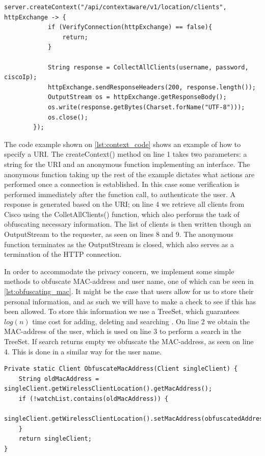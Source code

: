 \begin{lstlisting}[caption={Adding a URI},label={lst:context_code},language=inc_Java]
server.createContext("/api/contextaware/v1/location/clients", httpExchange -> {
            if (VerifyConnection(httpExchange) == false){
                return;
            }

            String response = CollectAllClients(username, password, ciscoIp);
            httpExchange.sendResponseHeaders(200, response.length());
            OutputStream os = httpExchange.getResponseBody();
            os.write(response.getBytes(Charset.forName("UTF-8")));
            os.close();
        });
\end{lstlisting}
The code example shown on \cref{lst:context_code} shows an example of how to specify a URI. The createContext() method on line 1 takes two parameters: a string for the URI and an anonymous function implementing an interface. The anonymous function taking up the rest of the example dictates what actions are performed once a connection is established. In this case some verification is performed immediately after the function call, to authenticate the user. A response is generated based on the URI; on line 4 we retrieve all clients from Cisco using the ColletAllClients() function, which also performs the task of obfuscating necessary information. The list of clients is then written though an OutputStream to the requester, as seen on lines 8 and 9. The anonymous function terminates as the OutputStream is closed, which also serves as a termination of the HTTP connection. 

In order to accommodate the privacy concern, we implement some simple methods to obfuscate MAC-address and user name, one of which can be seen in \cref{lst:obfuscating_mac}. It might be the case that users allow for us to store their personal information, and as such we will have to make a check to see if this has been allowed. To store this information we use a TreeSet, which guarantees $log(n)$ time cost for adding, deleting and searching \cite{treeset}. On line 2 we obtain the MAC-address of the user, which is used on line 3 to perform a search in the TreeSet. If search returns empty we obfuscate the MAC-address, as seen on line 4. This is done in a similar way for the user name.

\begin{lstlisting}[caption={Obfuscating mac-address},label={lst:obfuscating_mac},language=inc_Java]
Private static Client ObfuscateMacAddress(Client singleClient) {
    String oldMacAddress = singleClient.getWirelessClientLocation().getMacAddress();
    if (!watchList.contains(oldMacAddress)) {
        singleClient.getWirelessClientLocation().setMacAddress(obfuscatedAddress);
    }
    return singleClient;
}
\end{lstlisting}

